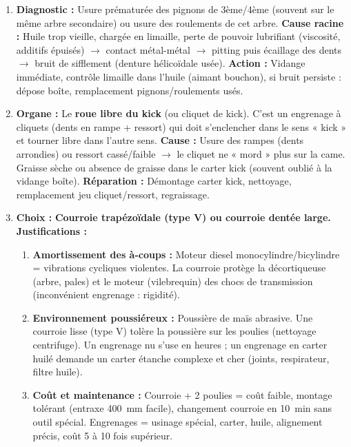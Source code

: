 \documentclass[11pt]{article}
\begin{document}
\begin{corrige}[Exercice 1]
\begin{enumerate}
    \item \textbf{Diagnostic :} Usure prématurée des pignons de 3ème/4ème (souvent sur le même arbre secondaire) ou usure des roulements de cet arbre. \textbf{Cause racine :} Huile trop vieille, chargée en limaille, perte de pouvoir lubrifiant (viscosité, additifs épuisés) $\rightarrow$ contact métal-métal $\rightarrow$ pitting puis écaillage des dents $\rightarrow$ bruit de sifflement (denture hélicoïdale usée). \textbf{Action :} Vidange immédiate, contrôle limaille dans l'huile (aimant bouchon), si bruit persiste : dépose boîte, remplacement pignons/roulements usés.
    \item \textbf{Organe :} Le \textbf{roue libre du kick} (ou cliquet de kick). C'est un engrenage à cliquets (dents en rampe + ressort) qui doit s'enclencher dans le sens « kick » et tourner libre dans l'autre sens. \textbf{Cause :} Usure des rampes (dents arrondies) ou ressort cassé/faible $\rightarrow$ le cliquet ne « mord » plus sur la came. Graisse sèche ou absence de graisse dans le carter kick (souvent oublié à la vidange boîte). \textbf{Réparation :} Démontage carter kick, nettoyage, remplacement jeu cliquet/ressort, regraissage.
    \item \textbf{Choix :} \textbf{Courroie trapézoïdale (type V) ou courroie dentée large.} \textbf{Justifications :}
    \begin{enumerate}
        \item \textbf{Amortissement des à-coups :} Moteur diesel monocylindre/bicylindre = vibrations cycliques violentes. La courroie protège la décortiqueuse (arbre, pales) et le moteur (vilebrequin) des chocs de transmission (inconvénient engrenage : rigidité).
        \item \textbf{Environnement poussiéreux :} Poussière de maïs abrasive. Une courroie lisse (type V) tolère la poussière sur les poulies (nettoyage centrifuge). Un engrenage nu s'use en heures ; un engrenage en carter huilé demande un carter étanche complexe et cher (joints, respirateur, filtre huile).
        \item \textbf{Coût et maintenance :} Courroie + 2 poulies = coût faible, montage tolérant (entraxe 400~mm facile), changement courroie en 10~min sans outil spécial. Engrenages = usinage spécial, carter, huile, alignement précis, coût 5 à 10 fois supérieur.
    \end{enumerate}
\end{enumerate}
\end{corrige}
\end{document}
